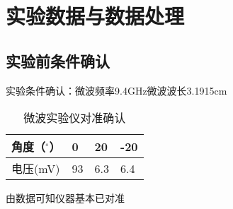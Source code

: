 \documentclass[12pt,a4paper]{article}
\begin{document}
    \section{实验数据与数据处理}
    \subsection{实验前条件确认}
    实验条件确认：微波频率9.4GHz\quad 微波波长3.1915cm
    \begin{table}[H]
        \centering
        \caption{微波实验仪对准确认}
        \begin{tabular}{|l|l|l|l|}
        \hline
            角度（$^{\circ}$） & 0 & 20 & -20 \\ \hline
            电压(mV) & 93 & 6.3 & 6.4 \\ \hline
        \end{tabular}
    \end{table}
    由数据可知仪器基本已对准
\end{document}
